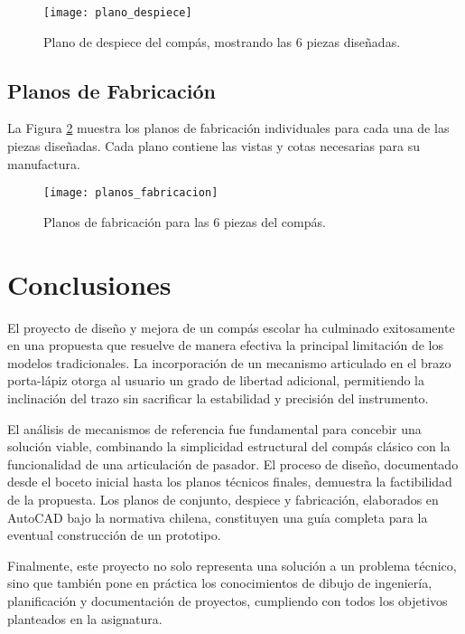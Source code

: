 \documentclass[11pt, a4paper]{article}
\begin{document}
\begin{figure}[htbp]
    \centering
    \texttt{[image: plano\_despiece]}
    \caption{Plano de despiece del compás, mostrando las 6 piezas diseñadas.}
    \label{fig:despiece}
\end{figure}
\newpage

\subsection{Planos de Fabricación}
La Figura \ref{fig:fabricacion} muestra los planos de fabricación individuales para cada una de las piezas diseñadas. Cada plano contiene las vistas y cotas necesarias para su manufactura.

\begin{figure}[htbp]
    \centering
    \texttt{[image: planos\_fabricacion]}
    \caption{Planos de fabricación para las 6 piezas del compás.}
    \label{fig:fabricacion}
\end{figure}

\newpage
\section{Conclusiones}
El proyecto de diseño y mejora de un compás escolar ha culminado exitosamente en una propuesta que resuelve de manera efectiva la principal limitación de los modelos tradicionales. La incorporación de un mecanismo articulado en el brazo porta-lápiz otorga al usuario un grado de libertad adicional, permitiendo la inclinación del trazo sin sacrificar la estabilidad y precisión del instrumento.

El análisis de mecanismos de referencia fue fundamental para concebir una solución viable, combinando la simplicidad estructural del compás clásico con la funcionalidad de una articulación de pasador. El proceso de diseño, documentado desde el boceto inicial hasta los planos técnicos finales, demuestra la factibilidad de la propuesta. Los planos de conjunto, despiece y fabricación, elaborados en AutoCAD bajo la normativa chilena, constituyen una guía completa para la eventual construcción de un prototipo.

Finalmente, este proyecto no solo representa una solución a un problema técnico, sino que también pone en práctica los conocimientos de dibujo de ingeniería, planificación y documentación de proyectos, cumpliendo con todos los objetivos planteados en la asignatura.

\printbibliography[title={Bibliografía}]
\end{document}
